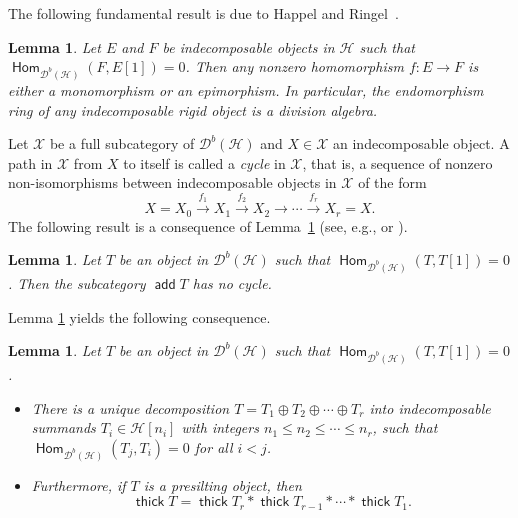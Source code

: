 \documentclass[12pt,a4paper,reqno]{amsart}
\newtheorem{lemma}[theorem]{Lemma}
\theoremstyle{definition}
\newcommand{\opname}[1]{\operatorname{\mathsf{#1}}}
\newcommand{\add}{\opname{add}\nolimits}
\newcommand{\der}{\cd}
\newcommand{\thick}{\opname{thick}}
\newcommand{\Hom}{\opname{Hom}}
\newcommand{\cd}{{\mathcal D}}
\begin{document}
The following fundamental result is due to Happel and Ringel~\cite{HappelRingel}.
\begin{lemma}\label{l:HR-exceptional}
Let $E$ and $F$ be indecomposable objects in $\mathcal{H}$ such that $\Hom_{\der^b(\mathcal{H})}(F, E[1])=0$. Then any nonzero homomorphism $f:E\to F$ is either a monomorphism or an epimorphism. In particular, the endomorphism ring of any indecomposable rigid object is a division algebra.
\end{lemma}

Let $\mathcal{X}$ be a full subcategory of $\der^b(\mathcal{H})$ and $X\in \mathcal{X}$ an indecomposable object. A path in $\mathcal{X}$ from $X$ to itself is called a {\em cycle} in $\mathcal{X}$, that is, a sequence of nonzero non-isomorphisms between indecomposable objects in $\mathcal{X}$ of the form
\[X=X_0\xrightarrow{f_1}X_1\xrightarrow{f_2}X_2\to \cdots\xrightarrow{f_r}X_r=X.
\]
The following result is a consequence of Lemma~\ref{l:HR-exceptional} (see, e.g., \cite[Lemma 4.2]{Fu} or \cite[Corollary 4.2]{HappelRingel}).
\begin{lemma}\label{l:no-cycle}
Let $T$ be an object in $\der^b(\mathcal{H})$ such that $\Hom_{\der^b(\mathcal{H})}(T, T[1])=0$. Then the subcategory $\add T$ has no cycle.
\end{lemma}

Lemma \ref{l:no-cycle} yields the following consequence.

\begin{lemma}\label{l:no-cycle-plus} Let $T$ be an object in $\der^b(\mathcal{H})$ such that $\Hom_{\der^b(\mathcal{H})}(T, T[1])=0$.
\begin{itemize}
    \item[(a)]  There is a unique decomposition $T =  T_1 \oplus T_2 \oplus \cdots \oplus T_r$ into indecomposable summands $T_i \in \mathcal{H}[n_i]$ with integers $n_1 \leq n_2 \leq \cdots \leq n_r$, such that $\Hom_{\der^b(\mathcal{H})}(T_j, T_i) = 0$ for all $i < j$.
    \item[(b)] Furthermore, if $T$ is a presilting object, then 
    \[
\thick T = \thick T_r * \thick T_{r-1} * \cdots * \thick T_1.
\]
\end{itemize}
\end{lemma}
\end{document}
